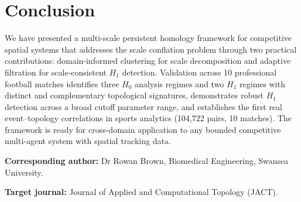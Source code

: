 \section{Conclusion}
\label{sec:conclusion}

We have presented a multi-scale persistent homology framework for competitive spatial systems that addresses the scale conflation problem through two practical contributions: domain-informed clustering for scale decomposition and adaptive filtration for scale-consistent \(H_1\) detection. Validation across 10 professional football matches identifies three \(H_0\) analysis regimes and two \(H_1\) regimes with distinct and complementary topological signatures, demonstrates robust \(H_1\) detection across a broad cutoff parameter range, and establishes the first real event--topology correlations in sports analytics (104,722 pairs, 10 matches). The framework is ready for cross-domain application to any bounded competitive multi-agent system with spatial tracking data.

\bigskip
\noindent\textbf{Corresponding author:} Dr Rowan Brown, Biomedical Engineering, Swansea University.

\noindent\textbf{Target journal:} Journal of Applied and Computational Topology (JACT).
